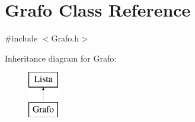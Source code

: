 \hypertarget{class_grafo}{\section{Grafo Class Reference}
\label{class_grafo}
}


{\ttfamily \#include $<$Grafo.\-h$>$}

Inheritance diagram for Grafo\-:\begin{figure}[H]
\begin{center}
\leavevmode
\includegraphics[height=2.000000cm]{class_grafo}
\end{center}
\end{figure}
